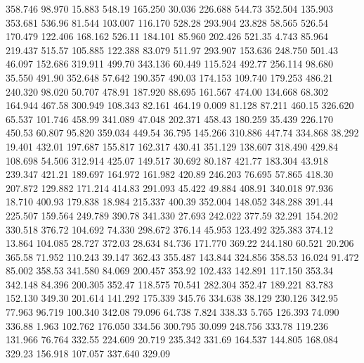  358.746   98.970   15.883       548.19
 165.250   30.036  226.688       544.73
 352.504  135.903  353.681       536.96
  81.544  103.007  116.170       528.28
 293.904   23.828   58.565       526.54
 170.479  122.406  168.162       526.11
 184.101   85.960  202.426       521.35
   4.743   85.964  219.437       515.57
 105.885  122.388   83.079       511.97
 293.907  153.636  248.750       501.43
  46.097  152.686  319.911       499.70
 343.136   60.449  115.524       492.77
 256.114   98.680   35.550       491.90
 352.648   57.642  190.357       490.03
 174.153  109.740  179.253       486.21
 240.320   98.020   50.707       478.91
 187.920   88.695  161.567       474.00
 134.668   68.302  164.944       467.58
 300.949  108.343   82.161       464.19
   0.009   81.128   87.211       460.15
 326.620   65.537  101.746       458.99
 341.089   47.048  202.371       458.43
 180.259   35.439  226.170       450.53
  60.807   95.820  359.034       449.54
  36.795  145.266  310.886       447.74
 334.868   38.292   19.401       432.01
 197.687  155.817  162.317       430.41
 351.129  138.607  318.490       429.84
 108.698   54.506  312.914       425.07
 149.517   30.692   80.187       421.77
 183.304   43.918  239.347       421.21
 189.697  164.972  161.982       420.89
 246.203   76.695   57.865       418.30
 207.872  129.882  171.214       414.83
 291.093   45.422   49.884       408.91
 340.018   97.936   18.710       400.93
 179.838   18.984  215.337       400.39
 352.004  148.052  348.288       391.44
 225.507  159.564  249.789       390.78
 341.330   27.693  242.022       377.59
  32.291  154.202  330.518       376.72
 104.692   74.330  298.672       376.14
  45.953  123.492  325.383       374.12
  13.864  104.085   28.727       372.03
  28.634   84.736  171.770       369.22
 244.180   60.521   20.206       365.58
  71.952  110.243   39.147       362.43
 355.487  143.844  324.856       358.53
  16.024   91.472   85.002       358.53
 341.580   84.069  200.457       353.92
 102.433  142.891  117.150       353.34
 342.148   84.396  200.305       352.47
 118.575   70.541  282.304       352.47
 189.221   83.783  152.130       349.30
 201.614  141.292  175.339       345.76
 334.638   38.129  230.126       342.95
  77.963   96.719  100.340       342.08
  79.096   64.738    7.824       338.33
   5.765  126.393   74.090       336.88
   1.963  102.762  176.050       334.56
 300.795   30.099  248.756       333.78
 119.236  131.966   76.764       332.55
 224.609   20.719  235.342       331.69
 164.537  144.805  168.084       329.23
 156.918  107.057  337.640       329.09
